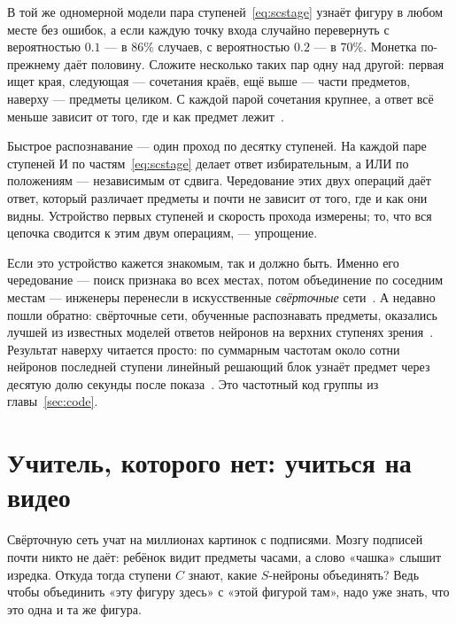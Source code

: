 В той же одномерной модели пара ступеней~\eqref{eq:scstage} узнаёт фигуру в любом месте без ошибок, а если каждую точку входа случайно перевернуть с вероятностью $0.1$ --- в $86\%$ случаев, с вероятностью $0.2$ --- в $70\%$. Монетка по-прежнему даёт половину. Сложите несколько таких пар одну над другой: первая ищет края, следующая --- сочетания краёв, ещё выше --- части предметов, наверху --- предметы целиком. С каждой парой сочетания крупнее, а ответ всё меньше зависит от того, где и как предмет лежит~\cite{Riesenhuber1999}.

\begin{keyblock}
\begin{proposition}
\label{prop:conveyor}
Быстрое распознавание --- один проход по десятку ступеней. На каждой паре ступеней И по частям~\eqref{eq:scstage} делает ответ избирательным, а ИЛИ по положениям --- независимым от сдвига. Чередование этих двух операций даёт ответ, который различает предметы и почти не зависит от того, где и как они видны. Устройство первых ступеней и скорость прохода измерены; то, что вся цепочка сводится к этим двум операциям, --- упрощение.
\end{proposition}
\end{keyblock}

Если это устройство кажется знакомым, так и должно быть. Именно его чередование --- поиск признака во всех местах, потом объединение по соседним местам --- инженеры перенесли в искусственные \emph{свёрточные} сети~\cite{Fukushima1980}. А недавно пошли обратно: свёрточные сети, обученные распознавать предметы, оказались лучшей из известных моделей ответов нейронов на верхних ступенях зрения~\cite{Yamins2014}. Результат наверху читается просто: по суммарным частотам около сотни нейронов последней ступени линейный решающий блок узнаёт предмет через десятую долю секунды после показа~\cite{Hung2005}. Это частотный код группы из главы~\ref{sec:code}.

\section{Учитель, которого нет: учиться на видео}

Свёрточную сеть учат на миллионах картинок с подписями. Мозгу подписей почти никто не даёт: ребёнок видит предметы часами, а слово «чашка» слышит изредка. Откуда тогда ступени $C$ знают, какие $S$-нейроны объединять? Ведь чтобы объединить «эту фигуру здесь» с «этой фигурой там», надо уже знать, что это одна и та же фигура.

